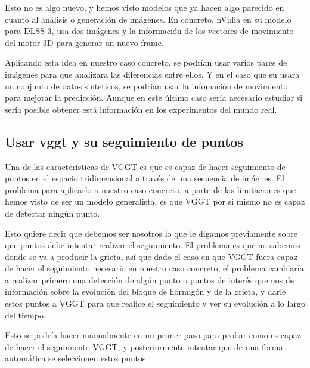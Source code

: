 Esto no es algo nuevo, y hemos visto modelos que ya hacen algo parecido en cuanto al análisis o generación de imágenes. En concreto, nVidia \cite{nvidia2022ada} en su modelo para DLSS 3, usa dos imágenes y la información de los vectores de movimiento del motor 3D para generar un nuevo frame.

Aplicando esta idea en nuestro caso concreto, se podrían usar varios pares de imágenes para que analizara las diferencias entre ellos. Y en el caso que su usara un conjunto de datos sintéticos, se podrían usar la infomación de movimiento para mejorar la predicción. Aunque en este último caso sería necesario estudiar si sería posible obtener está información en los experimentos del mundo real.

\subsection{Usar vggt y su seguimiento de puntos}
Una de las características de VGGT es que es capaz de hacer seguimiento de puntos en el espacio tridimensional a través de una secuencia de imágnes. El problema para aplicarlo a nuestro caso concreto, a parte de las limitaciones que hemos visto de ser un modelo generalista, es que VGGT por si mismo no es capaz de detectar ningún punto.

Esto quiere decir que debemos ser nosotros lo que le digamos previamente sobre que puntos debe intentar realizar el seguimiento. El problema es que no sabemos donde se va a producir la grieta, así que dado el caso en que VGGT fuera capaz de hacer el seguimiento necesario en nuestro caso concreto, el problema cambiaría a realizar primero una detección de algún punto o puntos de interés que nos de información sobre la evolución del bloque de hormigón y de la grieta, y darle estos puntos a VGGT para que realice el seguimiento y ver su evolución a lo largo del tiempo.

Esto se podría hacer manualmente en un primer paso para probar como es capaz de hacer el seguimiento VGGT, y posteriormente intentar que de una forma automática se seleccionen estos puntos.